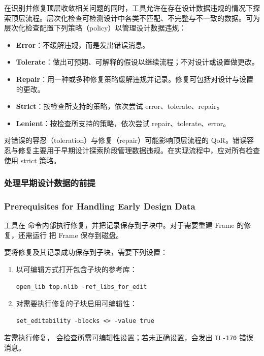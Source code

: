 在识别并修复顶层收敛相关问题的同时，工具允许在存在设计数据违规的情况下探索顶层流程。层次化检查可检测设计中各类不匹配、不完整与不一致的数据。可为层次化检查配置下列策略（policy）以管理设计数据违规：
\begin{itemize}
  \item \textbf{Error}：不缓解违规，而是发出错误消息。
  \item \textbf{Tolerate}：做出可预期、可解释的假设以继续流程；不对设计或设置做更改。
  \item \textbf{Repair}：用一种或多种修复策略缓解违规并记录。修复可包括对设计与设置的更改。
  \item \textbf{Strict}：按检查所支持的策略，依次尝试 error、tolerate、repair。
  \item \textbf{Lenient}：按检查所支持的策略，依次尝试 repair、tolerate、error。
\end{itemize}

\begin{noteBox}
对错误的容忍（toleration）与修复（repair）可能影响顶层流程的 QoR。错误容忍与修复主要用于早期设计探索阶段管理数据违规。在实现流程中，应对所有检查使用 strict 策略。
\end{noteBox}

\subsubsection{处理早期设计数据的前提}
\subsubsection*{Prerequisites for Handling Early Design Data}

工具在  命令内部执行修复，并把记录保存到子块中。对于需要重建 Frame 的修复，还需运行  把 Frame 保存到磁盘。

要将修复及其记录成功保存到子块，需要下列设置：
\begin{enumerate}
  \item 以可编辑方式打开包含子块的参考库：
\begin{lstlisting}
open_lib top.nlib -ref_libs_for_edit
\end{lstlisting}
  \item 对需要执行修复的子块启用可编辑性：
\begin{lstlisting}
set_editability -blocks <> -value true
\end{lstlisting}
\end{enumerate}

若需执行修复， 会检查所需可编辑性设置；若未正确设置，会发出 \texttt{TL-170} 错误消息。

